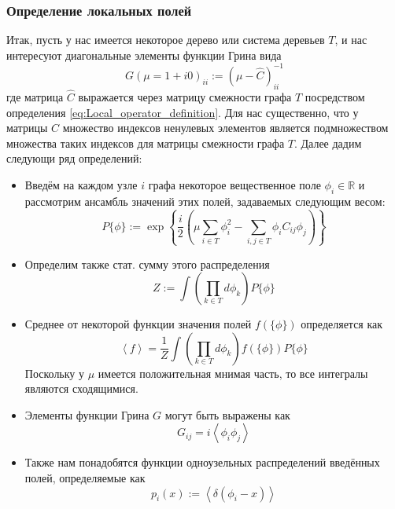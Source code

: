 \subsubsection{Определение локальных полей}
Итак, пусть у нас имеется некоторое дерево или система деревьев $T$, и нас интересуют диагональные элементы функции Грина вида
$$
G(\mu = 1 + i0)_{ii} := \left( \mu - \hat{C} \right)^{-1}_{ii} 
$$
где матрица $\hat{C}$ выражается через матрицу смежности графа $T$ посредством определения \eqref{eq:Local_operator_definition}. Для нас существенно, что у матрицы $C$ множество индексов ненулевых элементов является подмножеством множества таких индексов для матрицы смежности графа $T$. Далее дадим следующи ряд определений:
\begin{itemize}
	\item Введём на каждом узле $i$ графа некоторое вещественное поле $\phi_i \in \mathbb{R}$ и рассмотрим ансамбль значений этих полей, задаваемых следующим весом:
	\begin{equation}
	\label{eq:Cavity_method_generating_function}
	P\{\phi\} := \exp\left\{ \frac{i}{2} \left(\mu\sum_{i \in T}\phi_i^{2} - \sum_{i,j \in T} \phi_i C_{ij} \phi_j \right)\right\} 
	\end{equation}
	
	\item Определим также стат. сумму этого распределения
	\begin{equation}
	\label{eq:Cavity_method_partition_function_definition}
	Z := \int \left( \prod_{k \in T} d\phi_k \right) P\{\phi\}
	\end{equation}
	
	\item Среднее от некоторой функции значения полей $f\left( \{\phi\} \right)$ определяется как
	\begin{equation}
	\label{eq:Cavity_method_average_definition}
	\left\langle f \right\rangle = \frac{1}{Z} \int \left( \prod_{k \in T} d\phi_k \right) f\left( \{\phi\} \right) P\{\phi\} 
	\end{equation}
	Поскольку у $\mu$ имеется положительная мнимая часть, то все интегралы являются сходящимися. 
	
	\item Элементы функции Грина $G$ могут быть выражены как
	\begin{equation}
	\label{eq:Cavity_method_Green_function_expression}
	G_{ij} = i \left\langle \phi_i \phi_j \right\rangle
	\end{equation}
	
	\item Также нам понадобятся функции одноузельных распределений введённых полей, определяемые как
	\begin{equation}
	\label{eq:Cavity_method_single_field_distribution_definition}
	p_i(x) := \left\langle \delta(\phi_i - x) \right\rangle
	\end{equation}
	

\end{itemize}
